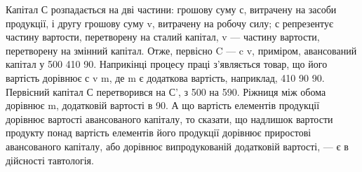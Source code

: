 
Капітал С розпадається на дві частини: грошову суму с, витрачену на засоби продукції, і другу
грошову суму v, витрачену на робочу силу; с репрезентує частину вартости, перетворену на сталий
капітал, v — частину вартости, перетворену на змінний капітал. Отже, первісно C — c \dplus{} v, приміром,
авансований капітал у 500 \deq{} 410 \dplus{} 90.
Наприкінці процесу праці з’являється товар, що його вартість дорівнює с \dplus{} v \dplus{} m, де m є додаткова
вартість, наприклад, 410 \dplus{} 90 \dplus{} 90. Первісний
капітал С перетворився на С',
з 500 на 590. Ріжниця між обома дорівнює m, додатковій вартості
в 90. А що вартість елементів продукції дорівнює вартості авансованого капіталу, то сказати, що
надлишок вартости продукту понад вартість елементів його продукції дорівнює приростові авансованого
капіталу, або дорівнює випродукованій додатковій вартості, — є в дійсності тавтологія.

